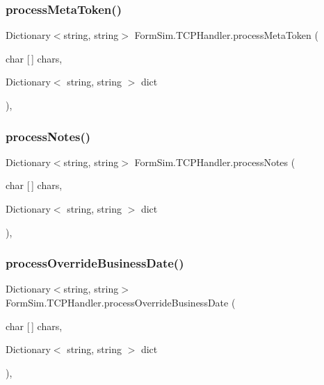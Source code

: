 \subsubsection{\texorpdfstring{process\+Meta\+Token()}{processMetaToken()}}
{\footnotesize\ttfamily Dictionary$<$string, string$>$ Form\+Sim.\+T\+C\+P\+Handler.\+process\+Meta\+Token (\begin{DoxyParamCaption}\item[{char \mbox{[}$\,$\mbox{]}}]{chars,  }\item[{Dictionary$<$ string, string $>$}]{dict }\end{DoxyParamCaption})\hspace{0.3cm}{\ttfamily [inline]}, {\ttfamily [private]}}

\mbox{\label{class_form_sim_1_1_t_c_p_handler_ad4d752f756499196f766dc999f789fdb}} 
\subsubsection{\texorpdfstring{process\+Notes()}{processNotes()}}
{\footnotesize\ttfamily Dictionary$<$string, string$>$ Form\+Sim.\+T\+C\+P\+Handler.\+process\+Notes (\begin{DoxyParamCaption}\item[{char \mbox{[}$\,$\mbox{]}}]{chars,  }\item[{Dictionary$<$ string, string $>$}]{dict }\end{DoxyParamCaption})\hspace{0.3cm}{\ttfamily [inline]}, {\ttfamily [private]}}

\mbox{\label{class_form_sim_1_1_t_c_p_handler_a7e41880df196b83e6ea06d2551c4e230}} 
\subsubsection{\texorpdfstring{process\+Override\+Business\+Date()}{processOverrideBusinessDate()}}
{\footnotesize\ttfamily Dictionary$<$string, string$>$ Form\+Sim.\+T\+C\+P\+Handler.\+process\+Override\+Business\+Date (\begin{DoxyParamCaption}\item[{char \mbox{[}$\,$\mbox{]}}]{chars,  }\item[{Dictionary$<$ string, string $>$}]{dict }\end{DoxyParamCaption})\hspace{0.3cm}{\ttfamily [inline]}, {\ttfamily [private]}}

